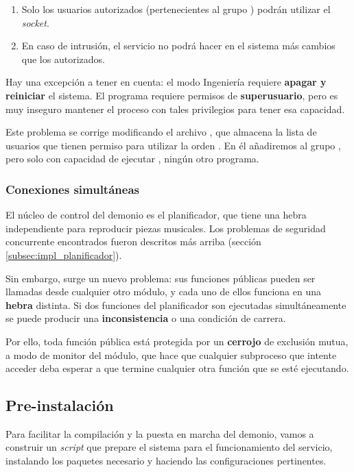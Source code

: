 \begin{enumerate}
	\item Solo los usuarios autorizados (pertenecientes al grupo ) podrán utilizar el \textit{socket}.
	
	\item En caso de intrusión, el servicio no podrá hacer en el sistema más cambios que los autorizados.
\end{enumerate}

Hay una excepción a tener en cuenta: el modo Ingeniería requiere\textbf{ apagar y reiniciar} el sistema. El programa  requiere permisos de \textbf{superusuario}, pero es muy inseguro mantener el proceso con tales privilegios para tener esa capacidad.

Este problema se corrige modificando el archivo , que almacena la lista de usuarios que tienen permiso para utilizar la orden . En él añadiremos al grupo , pero solo con capacidad de ejecutar , ningún otro programa.

\subsubsection{Conexiones simultáneas}

El núcleo de control del demonio es el planificador, que tiene una hebra independiente para reproducir piezas musicales. Los problemas de seguridad concurrente encontrados fueron descritos más arriba (sección \ref{subsec:impl_planificador}).

Sin embargo, surge un nuevo problema: sus funciones públicas pueden ser llamadas desde cualquier otro módulo, y cada uno de ellos funciona en una \textbf{hebra} distinta. Si dos funciones del planificador son ejecutadas simultáneamente se puede producir una \textbf{inconsistencia} o una condición de carrera.

Por ello, toda función pública está protegida por un \textbf{cerrojo} de exclusión mutua, a modo de monitor del módulo, que hace que cualquier subproceso que intente acceder deba esperar a que termine cualquier otra función que se esté ejecutando.

\subsection{Pre-instalación}

Para facilitar la compilación y la puesta en marcha del demonio, vamos a construir un \textit{script} que prepare el sistema para el funcionamiento del servicio, instalando los paquetes necesario y haciendo las configuraciones pertinentes.

